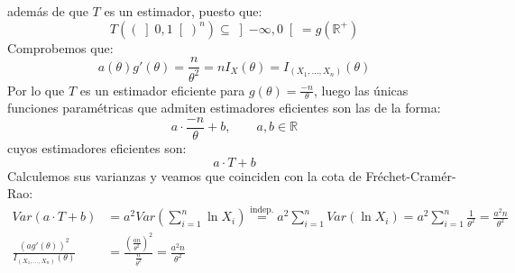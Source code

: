 \begin{ejercicio}
\begin{enumerate}[label=\alph*)]
            además de que $T$ es un estimador, puesto que:
            \begin{equation*}
                T({(\left]0,1\right[)}^{n}) \subseteq \left]-\infty,0\right[ = g(\mathbb{R}^+)
            \end{equation*}
            Comprobemos que:
            \begin{equation*}
                a(\theta)g'(\theta) = \frac{n}{\theta^2} = nI_X(\theta) = I_{(X_1, \ldots, X_n)}(\theta)
            \end{equation*}
            Por lo que $T$ es un estimador eficiente para $g(\theta) = \frac{-n}{\theta}$, luego las únicas funciones paramétricas que admiten estimadores eficientes son las de la forma:
            \begin{equation*}
                a\cdot \frac{-n}{\theta} + b, \qquad a,b\in \mathbb{R}
            \end{equation*}
            cuyos estimadores eficientes son:
            \begin{equation*}
                a\cdot T + b
            \end{equation*}
            Calculemos sus varianzas y veamos que coinciden con la cota de Fréchet-Cramér-Rao:
            \begin{align*}
                Var(a\cdot T+b) &= a^2 Var\left(\sum_{i=1}^{n}\ln X_i\right) \stackrel{\text{indep.}}{=} a^2 \sum_{i=1}^{n}Var(\ln X_i) = a^2 \sum_{i=1}^{n} \frac{1}{\theta^2} = \frac{a^2n}{\theta^2} \\
                \frac{{(ag'(\theta))}^{2}}{I_{(X_1,\ldots, X_n)}(\theta)} &= \frac{{(\frac{an}{\theta^2})}^{2}}{\frac{n}{\theta^2}} = \frac{a^2n}{\theta^2}
            \end{align*}
    \end{enumerate}
\end{ejercicio}
